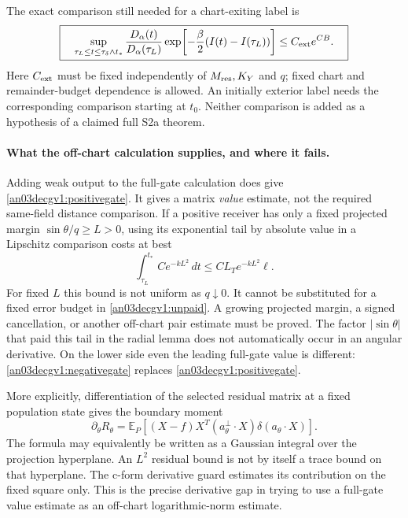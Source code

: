 \documentclass[11pt]{article}
\theoremstyle{remark}\newtheorem{remark}[proposition]{Remark}
\newcommand{\E}{\mathbb E}
\newcommand{\dd}{\,d}
\begin{document}
The exact comparison still needed for a chart-exiting label is
\begin{equation}
 \boxed{\quad
 \sup_{\tau_L\le t\le\tau_\delta\wedge t_*}
 \frac{D_\alpha(t)}{D_\alpha(\tau_L)}
 \exp\!\left[-\frac\beta2(I(t)-I(\tau_L))\right]
 \le C_{\rm ext}e^{CB}.
 \quad}
 \label{an03decgv1:unpaid}
\end{equation}
Here $C_{\rm ext}$ must be fixed independently of
$M_{\rm res},K_Y$ and $q$; fixed chart and remainder-budget
dependence is allowed. An initially exterior label needs the
corresponding comparison starting at $t_0$. Neither comparison
is added as a hypothesis of a claimed full S2a theorem.

\paragraph{What the off-chart calculation supplies, and where it fails.}
Adding weak output to the full-gate calculation does give
\eqref{an03decgv1:positivegate}. It gives a matrix \emph{value}
estimate, not the required same-field distance comparison.
If a positive receiver has only a fixed projected margin
$\sin\theta/q\ge L>0$, using its exponential tail by absolute
value in a Lipschitz comparison costs at best
\begin{equation}
 \int_{\tau_L}^{t_*}Ce^{-kL^2}\dd t
 \le CL_Te^{-kL^2}\ell.
 \label{an03decgv1:fixedmargin}
\end{equation}
For fixed $L$ this bound is not uniform as $q\downarrow0$.
It cannot be substituted for a fixed error budget in
\eqref{an03decgv1:unpaid}. A growing projected margin, a signed
cancellation, or another off-chart pair estimate must be proved.
The factor $|\sin\theta|$ that paid this tail in the radial
lemma does not automatically occur in an angular derivative.
On the lower side even the leading full-gate value is different:
\eqref{an03decgv1:negativegate} replaces
\eqref{an03decgv1:positivegate}.

More explicitly, differentiation of the selected residual matrix
at a fixed population state gives the boundary moment
\begin{equation}
 \partial_\theta R_\theta
 =\E_P\!\left[(X-f)X^T(a_\theta^\perp\!\cdot X)
                         \delta(a_\theta\cdot X)\right].
 \label{an03decgv1:boundary}
\end{equation}
The formula may equivalently be written as a Gaussian integral
over the projection hyperplane. An $L^2$ residual bound is not
by itself a trace bound on that hyperplane. The c-form derivative
guard estimates its contribution on the fixed square only.
This is the precise derivative gap in trying to use a full-gate
value estimate as an off-chart logarithmic-norm estimate.
\end{document}
